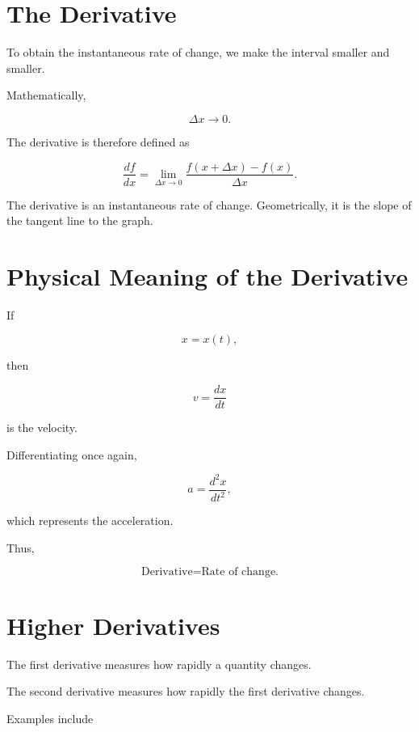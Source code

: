 \documentclass[11pt,a4paper,openany]{book}
\begin{document}
\section{The Derivative}

To obtain the instantaneous rate of change, we make the interval
smaller and smaller.

Mathematically,

\[
\Delta x\rightarrow0.
\]

The derivative is therefore defined as

\[
\boxed{
	\frac{df}{dx}
	=
	\lim_{\Delta x\rightarrow0}
	\frac{f(x+\Delta x)-f(x)}
	{\Delta x}.
}
\]

\begin{keyidea}
The derivative is an instantaneous rate of change. Geometrically, it is the
slope of the tangent line to the graph.
\end{keyidea}


\section{Physical Meaning of the Derivative}

If

\[
x=x(t),
\]

then

\[
\boxed{
	v=\frac{dx}{dt}
}
\]

is the velocity.

Differentiating once again,

\[
\boxed{
	a=\frac{d^2x}{dt^2},
}
\]

which represents the acceleration.

Thus,

\[
\boxed{
	\text{Derivative}
	=
	\text{Rate of change.}
}
\]


\section{Higher Derivatives}

The first derivative measures how rapidly a quantity changes.

The second derivative measures how rapidly the first derivative changes.

Examples include
\end{document}
